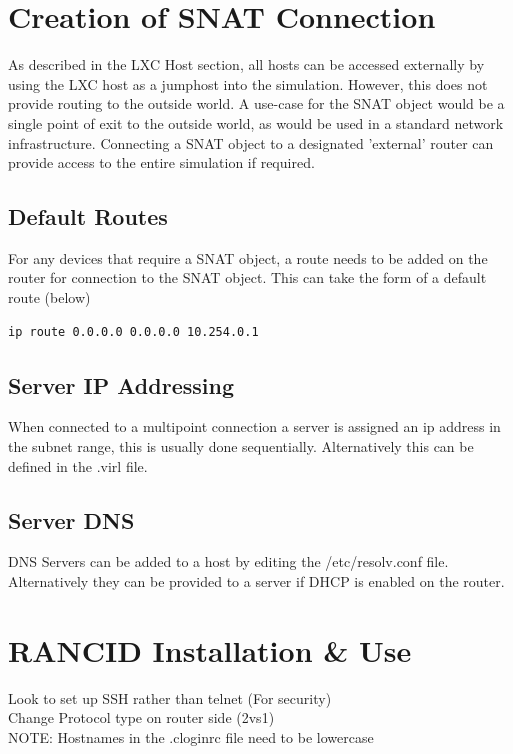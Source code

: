 \documentclass[11pt]{report}
\begin{document}
\section*{Creation of SNAT Connection}

As described in the LXC Host section, all hosts can be accessed externally by using the LXC host as a jumphost into the simulation. However, this does not provide routing to the outside world. A use-case for the SNAT object would be a single point of exit to the outside world, as would be used in a standard network infrastructure. Connecting a SNAT object to a designated 'external' router can provide access to the entire simulation if required.

\subsection*{Default Routes}

For any devices that require a SNAT object, a route needs to be added on the router for connection to the SNAT object. This can take the form of a default route (below)

\begin{lstlisting}
ip route 0.0.0.0 0.0.0.0 10.254.0.1
\end{lstlisting}

\subsection*{Server IP Addressing}

When connected to a multipoint connection a server is assigned an ip address in the subnet range, this is usually done sequentially. Alternatively this can be defined in the .virl file.

\subsection*{Server DNS}

DNS Servers can be added to a host by editing the /etc/resolv.conf file. Alternatively they can be provided to a server if DHCP is enabled on the router.

\section*{RANCID Installation \& Use}

Look to set up SSH rather than telnet (For security)
\\
Change Protocol type on router side (2vs1)
\\
NOTE: Hostnames in the .cloginrc file need to be lowercase
\end{document}
